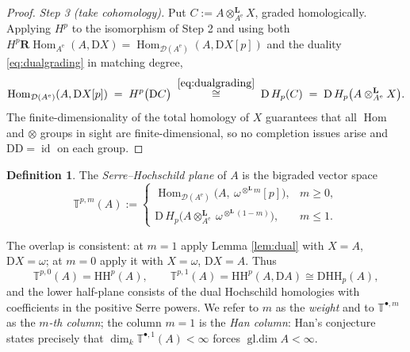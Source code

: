 \documentclass[11pt]{amsart}
\theoremstyle{definition}
\newtheorem{definition}[theorem]{Definition}
\newcommand{\T}{\mathbb{T}}
\newcommand{\HH}{\mathrm{HH}}
\newcommand{\D}{\mathrm{D}}
\newcommand{\Hom}{\operatorname{Hom}}
\newcommand{\rHom}{\mathbf{R}\!\operatorname{Hom}}
\newcommand{\gl}{\operatorname{gl.dim}}
\newcommand{\id}{\operatorname{id}}
\newcommand{\Ae}{A^{\mathrm{e}}}
\newcommand{\der}{\mathcal{D}}
\newcommand{\Lotimes}{\otimes^{\mathbf{L}}}
\newcommand{\kk}{k}
\begin{document}
\begin{proof}
\emph{Step 3 (take cohomology).} Put $C:=A\Lotimes_{\Ae}X$, graded
homologically. Applying $H^p$ to the isomorphism of Step 2 and using both
$H^p\rHom_{\Ae}(A,\D X)=\Hom_{\der(\Ae)}(A,\D X[p])$ and the duality
\eqref{eq:dualgrading} in matching degree,
\[
\Hom_{\der(\Ae)}(A,\D X[p])\;=\;H^p\bigl(\D C\bigr)
\;\overset{\eqref{eq:dualgrading}}{\cong}\;\D\,H_p(C)
\;=\;\D\,H_p\bigl(A\Lotimes_{\Ae}X\bigr).
\]
The finite-dimensionality of the total homology of $X$ guarantees that all
$\Hom$ and $\otimes$ groups in sight are finite-dimensional, so no
completion issues arise and $\D\D=\id$ on each group.
\end{proof}

\begin{definition}\label{def:plane}
The \emph{Serre--Hochschild plane} of $A$ is the bigraded vector space
\[
\T^{p,m}(A):=
\begin{cases}
\Hom_{\der(\Ae)}\bigl(A,\ \omega^{\Lotimes m}[p]\bigr), & m\ge0,\\[2pt]
\D\,H_p\bigl(A\Lotimes_{\Ae}\ \omega^{\Lotimes (1-m)}\bigr), & m\le1.
\end{cases}
\]
\end{definition}

The overlap is consistent: at $m=1$ apply Lemma \ref{lem:dual} with $X=A$,
$\D X=\omega$; at $m=0$ apply it with $X=\omega$, $\D X=A$. Thus
\[
\T^{p,0}(A)=\HH^p(A),\qquad
\T^{p,1}(A)=\HH^p(A,\D A)\cong\D\HH_p(A),
\]
and the lower half-plane consists of the dual Hochschild homologies with
coefficients in the positive Serre powers. We refer to $m$ as the
\emph{weight} and to $\T^{\bullet,m}$ as the \emph{$m$-th column}; the column
$m=1$ is the \emph{Han column}: Han's conjecture states precisely that
$\dim_\kk\T^{\bullet,1}(A)<\infty$ forces $\gl A<\infty$.
\end{document}
